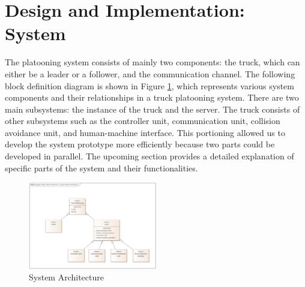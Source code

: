 \section{Design and Implementation: System}
\label{sec:design and implementation_system} 
The platooning system consists of mainly two components: the truck, which can either be a leader or a follower, and the communication channel. The following block definition diagram is shown in Figure \ref{img:system_bdd}, which represents various system components and their relationships in a truck platooning system. There are two main subsystems: the instance of the truck and the server. The truck consists of other subsystems such as the controller unit, communication unit, collision avoidance unit, and human-machine interface. This portioning allowed us to develop the system prototype more efficiently because two parts could be developed in parallel. The upcoming section provides a detailed explanation of specific parts of the system and their functionalities.
\begin{figure}[ht]
    \centering
    \includegraphics[width=0.5\textwidth]{images/system_bdd.png}
    \caption{System Architecture}
    \label{img:system_bdd}
\end{figure}